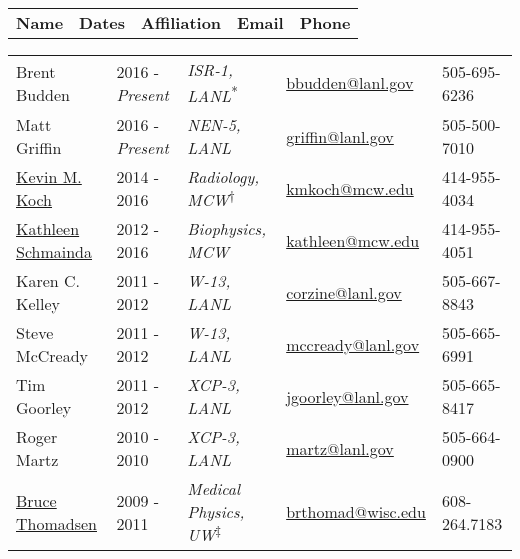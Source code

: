 
\normalsize


\begin{center}
\begin{minipage}{\textwidth}
\begin{tabular}{p{3.2cm}p{2.2cm}p{3.7cm}p{5.0cm}p{2.4cm}}
\textbf{Name} & \textbf{Dates}  & \textbf{Affiliation} & \textbf{Email} & \textbf{Phone} \\
\end{tabular}
\end{minipage}
\end{center}


\begin{center}
\begin{minipage}{\textwidth}
\begin{tabular}{p{3.2cm}p{2.2cm}p{3.7cm}p{5.0cm}p{2.4cm}}
Brent Budden & 2016 - \emph{Present} & \textit{ISR-1, LANL}\textsuperscript{*} &  \href{mailto:bbudden@lanl.gov}{bbudden@lanl.gov} & 505-695-6236 \\
Matt Griffin & 2016 - \emph{Present} & \textit{NEN-5, LANL}                    &  \href{mailto:griffin@lanl.gov}{griffin@lanl.gov} & 505-500-7010 \\
\href{http://www.mcw.edu/radiology/faculty/Kevin-Koch-PhD.htm}{Kevin M. Koch} & 2014 - 2016 & \textit{Radiology, MCW}\textsuperscript{$\dagger$} & \href{mailto:kmkoch@mcw.edu}{kmkoch@mcw.edu} & 414-955-4034 \\
\href{http://www.mcw.edu/radiology/faculty/Kathleen-Schmainda-PhD.htm}{Kathleen Schmainda} & 2012 - 2016 & \textit{Biophysics, MCW}  & \href{mailto:kathleen@mcw.edu}{kathleen@mcw.edu} &  414-955-4051 \\
Karen C. Kelley & 2011 - 2012 & \textit{W-13, LANL} & \href{mailto:corzine@lanl.gov}{corzine@lanl.gov} & 505-667-8843 \\
Steve McCready & 2011 - 2012 &\textit{W-13, LANL} & \href{mailto:mccready@lanl.gov}{mccready@lanl.gov} & 505-665-6991 \\
Tim Goorley & 2011 - 2012 & \textit{XCP-3, LANL} &\href{mailto:jgoorley@lanl.gov}{jgoorley@lanl.gov} & 505-665-8417 \\
Roger Martz & 2010 - 2010 & \textit{XCP-3, LANL} & \href{mailto:martz@lanl.gov}{martz@lanl.gov} &  505-664-0900 \\
{\href{https://www.medphysics.wisc.edu/directory/thomadsen.php}{Bruce Thomadsen}} \label{bruce_thomadsen}& 2009 - 2011 & \textit{Medical Physics, UW}\textsuperscript{$\ddagger$} & \href{mailto:brthomad@wisc.edu}{brthomad@wisc.edu} &  608-264.7183 \\

\end{tabular}
\end{minipage}
\end{center}

